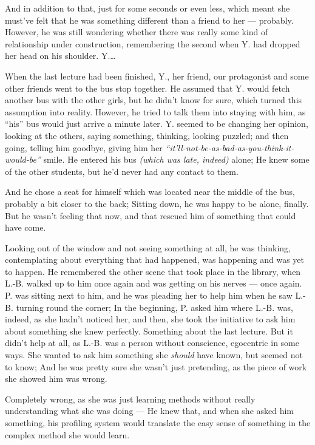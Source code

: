 And in addition to that, just for some seconds or even less, which meant she must've felt that he was something different than a friend to her --- probably. However, he was still wondering whether there was really some kind of relationship under construction, remembering the second when Y. had dropped her head on his shoulder. 
Y.\ldots

When the last lecture had been finished, Y., her friend, our protagonist and some other friends went to the bus stop together. He assumed that Y. would fetch another bus with the other girls, but he didn't know for sure, which turned this assumption into reality. However, he tried to talk them into staying with him, as \enquote{his} bus would just arrive a minute later. Y. seemed to be changing her opinion, looking at the others, saying something, thinking, looking puzzled; and then going, telling him goodbye, giving him her \emph{\enquote{it'll-not-be-as-bad-as-you-think-it-would-be}} smile. 
He entered his bus \emph{(which was late, indeed)} alone; He knew some of the other students, but he'd never had any contact to them.

And he chose a seat for himself which was located near the middle of the bus, probably a bit closer to the back; Sitting down, he was happy to be alone, finally. But he wasn't feeling that now, and that rescued him of something that could have come.

Looking out of the window and not seeing something at all, he was thinking, contemplating about everything that had happened, was happening and was yet to happen. He remembered the other scene that took place in the library, when L.-B. walked up to him once again and was getting on his nerves --- once again. P. was sitting next to him, and he was pleading her to help him when he saw L.-B. turning round the corner; In the beginning, P. asked him where L.-B. was, indeed, as she hadn't noticed her, and then, she took the initiative to ask him about something she knew perfectly. Something about the last lecture. But it didn't help at all, as L.-B. was a person without conscience, egocentric in some ways. She wanted to ask him something she \emph{should} have known, but seemed not to know; And he was pretty sure she wasn't just pretending, as the piece of work she showed him was wrong.

Completely wrong, as she was just learning methods without really understanding what she was doing --- He knew that, and when she asked him something, his profiling system would translate the easy sense of something in the complex method she would learn.

